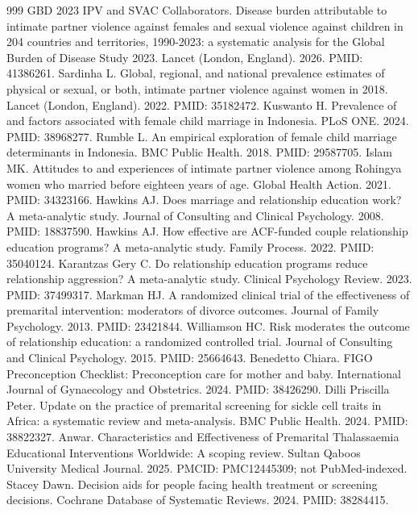 \begin{thebibliography}{999}\footnotesize
{} GBD 2023 IPV and SVAC Collaborators. Disease burden attributable to intimate partner violence against females and sexual violence against children in 204 countries and territories, 1990-2023: a systematic analysis for the Global Burden of Disease Study 2023. Lancet (London, England). 2026. PMID: 41386261.
 Sardinha L. Global, regional, and national prevalence estimates of physical or sexual, or both, intimate partner violence against women in 2018. Lancet (London, England). 2022. PMID: 35182472.
 Kuswanto H. Prevalence of and factors associated with female child marriage in Indonesia. PLoS ONE. 2024. PMID: 38968277.
 Rumble L. An empirical exploration of female child marriage determinants in Indonesia. BMC Public Health. 2018. PMID: 29587705.
 Islam MK. Attitudes to and experiences of intimate partner violence among Rohingya women who married before eighteen years of age. Global Health Action. 2021. PMID: 34323166.
 Hawkins AJ. Does marriage and relationship education work? A meta-analytic study. Journal of Consulting and Clinical Psychology. 2008. PMID: 18837590.
 Hawkins AJ. How effective are ACF-funded couple relationship education programs? A meta-analytic study. Family Process. 2022. PMID: 35040124.
 Karantzas Gery C. Do relationship education programs reduce relationship aggression? A meta-analytic study. Clinical Psychology Review. 2023. PMID: 37499317.
 Markman HJ. A randomized clinical trial of the effectiveness of premarital intervention: moderators of divorce outcomes. Journal of Family Psychology. 2013. PMID: 23421844.
 Williamson HC. Risk moderates the outcome of relationship education: a randomized controlled trial. Journal of Consulting and Clinical Psychology. 2015. PMID: 25664643.
 Benedetto Chiara. FIGO Preconception Checklist: Preconception care for mother and baby. International Journal of Gynaecology and Obstetrics. 2024. PMID: 38426290.
 Dilli Priscilla Peter. Update on the practice of premarital screening for sickle cell traits in Africa: a systematic review and meta-analysis. BMC Public Health. 2024. PMID: 38822327.
 Anwar. Characteristics and Effectiveness of Premarital Thalassaemia Educational Interventions Worldwide: A scoping review. Sultan Qaboos University Medical Journal. 2025. PMCID: PMC12445309; not PubMed-indexed.
 Stacey Dawn. Decision aids for people facing health treatment or screening decisions. Cochrane Database of Systematic Reviews. 2024. PMID: 38284415.

\end{thebibliography}
